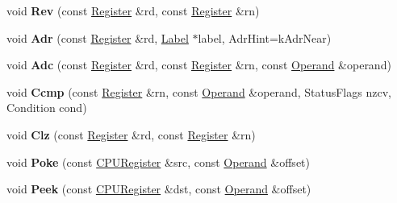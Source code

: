 \begin{DoxyCompactItemize}
void {\bfseries Rev} (const \mbox{\hyperlink{classv8_1_1internal_1_1Register}{Register}} \&rd, const \mbox{\hyperlink{classv8_1_1internal_1_1Register}{Register}} \&rn)
\item 
\mbox{\label{classv8_1_1internal_1_1TurboAssembler_aba24f9d7e6bd97da01ec5a63702fe8a6}} 
void {\bfseries Adr} (const \mbox{\hyperlink{classv8_1_1internal_1_1Register}{Register}} \&rd, \mbox{\hyperlink{classv8_1_1internal_1_1Label}{Label}} $\ast$label, Adr\+Hint=k\+Adr\+Near)
\item 
\mbox{\label{classv8_1_1internal_1_1TurboAssembler_ae962c6e8bba1108bbe2b881e5b7a91f4}} 
void {\bfseries Adc} (const \mbox{\hyperlink{classv8_1_1internal_1_1Register}{Register}} \&rd, const \mbox{\hyperlink{classv8_1_1internal_1_1Register}{Register}} \&rn, const \mbox{\hyperlink{classv8_1_1internal_1_1Operand}{Operand}} \&operand)
\item 
\mbox{\label{classv8_1_1internal_1_1TurboAssembler_a31d6ccb59a9d76fa976e5576ca992442}} 
void {\bfseries Ccmp} (const \mbox{\hyperlink{classv8_1_1internal_1_1Register}{Register}} \&rn, const \mbox{\hyperlink{classv8_1_1internal_1_1Operand}{Operand}} \&operand, Status\+Flags nzcv, Condition cond)
\item 
\mbox{\label{classv8_1_1internal_1_1TurboAssembler_a753b23b7aa0807915058a4a383af0e6f}} 
void {\bfseries Clz} (const \mbox{\hyperlink{classv8_1_1internal_1_1Register}{Register}} \&rd, const \mbox{\hyperlink{classv8_1_1internal_1_1Register}{Register}} \&rn)
\item 
\mbox{\label{classv8_1_1internal_1_1TurboAssembler_a5034c7b9666e168d4c5fd33ac6a79f9f}} 
void {\bfseries Poke} (const \mbox{\hyperlink{classv8_1_1internal_1_1CPURegister}{C\+P\+U\+Register}} \&src, const \mbox{\hyperlink{classv8_1_1internal_1_1Operand}{Operand}} \&offset)
\item 
\mbox{\label{classv8_1_1internal_1_1TurboAssembler_a6f8f3ac02fff7aac669ae464171f4d05}} 
void {\bfseries Peek} (const \mbox{\hyperlink{classv8_1_1internal_1_1CPURegister}{C\+P\+U\+Register}} \&dst, const \mbox{\hyperlink{classv8_1_1internal_1_1Operand}{Operand}} \&offset)

\end{DoxyCompactItemize}
